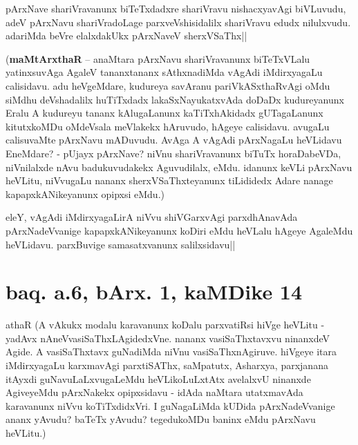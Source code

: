 \stext


\begin{artha}
pArxNave shariVravanunx biTeTxdadxre shariVravu nishacxyavAgi 
biVLuvudu, adeV pArxNavu shariVradoLage parxveVshisidalilx shariVravu 
edudx nilulxvudu. adariMda beVre elalxdakUkx pArxNaveV sherxVSaThx||
\end{artha}

(\textbf{maMtArxthaR} -- anaMtara pArxNavu shariVravanunx biTeTxVLalu 
yatinxsuvAga AgaleV tananxtananx sAthxnadiMda vAgAdi iMdirxyagaLu 
calisidavu. adu heVgeMdare, kudureya savAranu pariVkASxthaRvAgi oMdu 
siMdhu deVshadalilx huTiTxdadx lakaSxNayukatxvAda doDaDx kudureyanunx 
Eralu A kudureyu tananx kAlugaLanunx kaTiTxhAkidadx gUTagaLanunx 
kitutxkoMDu oMdeVsala meVlakekx hAruvudo, hAgeye calisidavu. avugaLu 
calisuvaMte pArxNavu mADuvudu. AvAga A vAgAdi pArxNagaLu heVLidavu 
EneMdare? - pUjayx pArxNave? niVnu shariVravanunx biTuTx horaDabeVDa, 
niVnilalxde nAvu badukuvudakekx Aguvudilalx, eMdu. idanunx keVLi 
pArxNavu heVLitu, niVvugaLu nananx sherxVSaThxteyanunx tiLididedx 
Adare nanage kapapxkANikeyanunx opipxsi eMdu.)


\begin{artha}
eleY, vAgAdi iMdirxyagaLirA niVvu shiVGarxvAgi parxdhAnavAda 
pArxNadeVvanige kapapxkANikeyanunx koDiri eMdu heVLalu hAgeye AgaleMdu 
heVLidavu. parxBuvige samasatxvanunx salilxsidavu||
\end{artha}


\section*{baq. a.6, bArx. 1, kaMDike 14}

\stext

athaR (A vAkukx modalu karavanunx koDalu parxvatiRsi hiVge heVLitu - 
yadAvx nAneVvasiSaThxLAgidedxVne. nananx vasiSaThxtavxvu ninanxdeV 
Agide. A vasiSaThxtavx guNadiMda niVnu vasiSaThxnAgiruve. hiVgeye 
itara iMdirxyagaLu karxmavAgi parxtiSAThx, saMpatutx, Asharxya, 
parxjanana itAyxdi guNavuLaLxvugaLeMdu heVLikoLuLxtAtx avelalxvU 
ninanxde AgiveyeMdu pArxNakekx opipxsidavu - idAda naMtara utatxmavAda 
karavanunx niVvu koTiTxdidxVri. I guNagaLiMda kUDida pArxNadeVvanige 
ananx yAvudu? baTeTx yAvudu? tegedukoMDu baninx eMdu pArxNavu heVLitu.)

